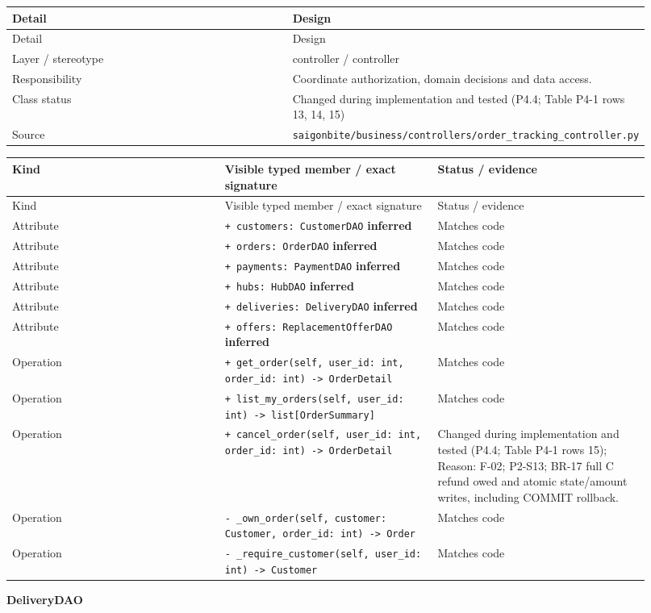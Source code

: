 \begin{longtable}{>{\raggedright\arraybackslash}p{0.4600\linewidth}>{\raggedright\arraybackslash}p{0.4600\linewidth}}
Detail & Design \\
\hline\endfirsthead
Detail & Design \\
\hline\endhead
Layer / stereotype & controller / \guillemotleft{}controller\guillemotright{} \\
Responsibility & Coordinate authorization, domain decisions and data access. \\
Class status & Changed during implementation and tested (P4.4; Table P4-1 rows 13, 14, 15) \\
Source & \texttt{saigonbite/\allowbreak{}business/\allowbreak{}controllers/\allowbreak{}order\_\allowbreak{}tracking\_\allowbreak{}controller.\allowbreak{}py} \\
\end{longtable}
\begin{longtable}{>{\raggedright\arraybackslash}p{0.3067\linewidth}>{\raggedright\arraybackslash}p{0.3067\linewidth}>{\raggedright\arraybackslash}p{0.3067\linewidth}}
Kind & Visible typed member / exact signature & Status / evidence \\
\hline\endfirsthead
Kind & Visible typed member / exact signature & Status / evidence \\
\hline\endhead
Attribute & \texttt{+ customers: CustomerDAO} \textbf{inferred} & Matches code \\
Attribute & \texttt{+ orders: OrderDAO} \textbf{inferred} & Matches code \\
Attribute & \texttt{+ payments: PaymentDAO} \textbf{inferred} & Matches code \\
Attribute & \texttt{+ hubs: HubDAO} \textbf{inferred} & Matches code \\
Attribute & \texttt{+ deliveries: DeliveryDAO} \textbf{inferred} & Matches code \\
Attribute & \texttt{+ offers: ReplacementOfferDAO} \textbf{inferred} & Matches code \\
Operation & \texttt{+ get\_\allowbreak{}order(self, user\_\allowbreak{}id: int, order\_\allowbreak{}id: int) -\textgreater{} OrderDetail} & Matches code \\
Operation & \texttt{+ list\_\allowbreak{}my\_\allowbreak{}orders(self, user\_\allowbreak{}id: int) -\textgreater{} list[OrderSummary]} & Matches code \\
Operation & \texttt{+ cancel\_\allowbreak{}order(self, user\_\allowbreak{}id: int, order\_\allowbreak{}id: int) -\textgreater{} OrderDetail} & Changed during implementation and tested (P4.4; Table P4-1 rows 15); Reason: F-02; P2-S13; BR-17 full C refund owed and atomic state/amount writes, including COMMIT rollback. \\
Operation & \texttt{- \_\allowbreak{}own\_\allowbreak{}order(self, customer: Customer, order\_\allowbreak{}id: int) -\textgreater{} Order} & Matches code \\
Operation & \texttt{- \_\allowbreak{}require\_\allowbreak{}customer(self, user\_\allowbreak{}id: int) -\textgreater{} Customer} & Matches code \\
\end{longtable}
\textbf{DeliveryDAO}

